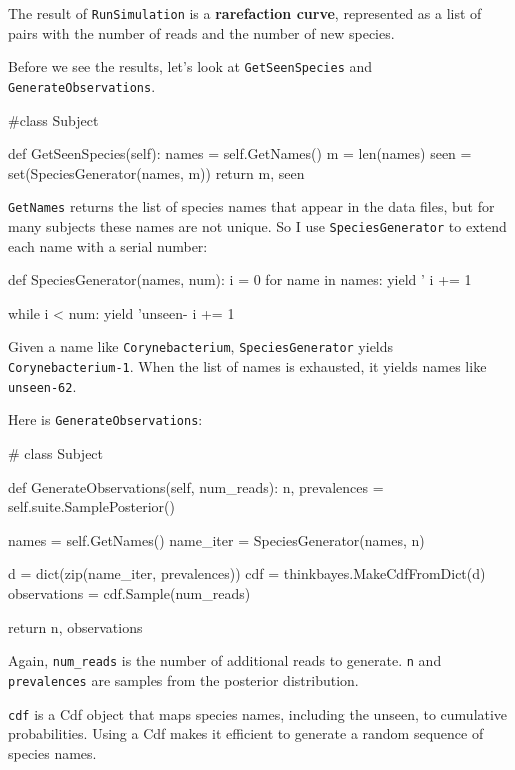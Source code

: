 \documentclass[12pt]{book}
\theoremstyle{exercise}
\begin{document}
The result of {\tt RunSimulation} is a {\bf rarefaction curve},
represented as a list of pairs with the number of reads and
the number of new species.

Before we see the results, let's look at {\tt GetSeenSpecies} and
{\tt GenerateObservations}.

\begin{code}
#class Subject

    def GetSeenSpecies(self):
        names = self.GetNames()
        m = len(names)
        seen = set(SpeciesGenerator(names, m))
        return m, seen
\end{code}

{\tt GetNames} returns the list of species names that appear in
the data files, but for many subjects these names are not unique.
So I use {\tt SpeciesGenerator} to extend each name with a serial
number:

\begin{code}
def SpeciesGenerator(names, num):
    i = 0
    for name in names:
        yield '%
        i += 1

    while i < num:
        yield 'unseen-%
        i += 1
\end{code}

Given a name like {\tt Corynebacterium}, {\tt SpeciesGenerator} yields
{\tt Corynebacterium-1}.  When the list of names is exhausted, it
yields names like {\tt unseen-62}.

Here is {\tt GenerateObservations}:

\begin{code}
# class Subject

    def GenerateObservations(self, num_reads):
        n, prevalences = self.suite.SamplePosterior()

        names = self.GetNames()
        name_iter = SpeciesGenerator(names, n)

        d = dict(zip(name_iter, prevalences))
        cdf = thinkbayes.MakeCdfFromDict(d)
        observations = cdf.Sample(num_reads)

        return n, observations
\end{code}

Again, \verb"num_reads" is the number of additional reads
to generate.  {\tt n} and {\tt prevalences} are samples from
the posterior distribution.

{\tt cdf} is a Cdf object that maps species names, including the
unseen, to cumulative probabilities.  Using a Cdf makes it efficient
to generate a random sequence of species names.
\end{document}
